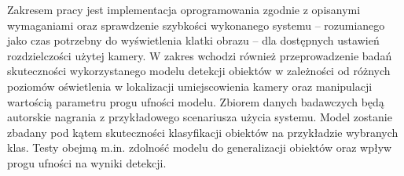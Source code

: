 Zakresem pracy jest implementacja oprogramowania zgodnie z opisanymi wymaganiami oraz sprawdzenie szybkości wykonanego systemu -- rozumianego jako czas potrzebny do wyświetlenia klatki obrazu -- dla dostępnych ustawień rozdzielczości użytej kamery.   
W zakres wchodzi również przeprowadzenie badań skuteczności wykorzystanego modelu detekcji obiektów w zależności od różnych poziomów oświetlenia w lokalizacji umiejscowienia kamery oraz manipulacji wartością parametru progu ufności modelu. Zbiorem danych badawczych będą autorskie nagrania z przykładowego scenariusza użycia systemu. Model zostanie zbadany pod kątem skuteczności klasyfikacji obiektów na przykładzie wybranych klas. Testy obejmą m.in. zdolność modelu do generalizacji obiektów oraz wpływ progu ufności na wyniki detekcji.